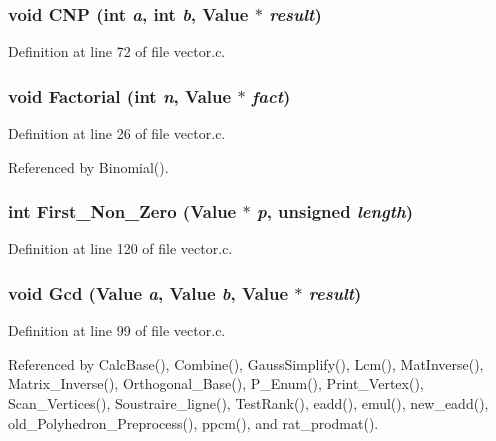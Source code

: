 \subsubsection{\setlength{\rightskip}{0pt plus 5cm}void CNP (int {\em a}, int {\em b}, Value $\ast$ {\em result})}\label{vector_8c_a2}




Definition at line 72 of file vector.c.
\subsubsection{\setlength{\rightskip}{0pt plus 5cm}void Factorial (int {\em n}, Value $\ast$ {\em fact})}\label{vector_8c_a0}




Definition at line 26 of file vector.c.

Referenced by Binomial().

\subsubsection{\setlength{\rightskip}{0pt plus 5cm}int First\_\-Non\_\-Zero (Value $\ast$ {\em p}, unsigned {\em length})}\label{vector_8c_a4}




Definition at line 120 of file vector.c.
\subsubsection{\setlength{\rightskip}{0pt plus 5cm}void Gcd (Value {\em a}, Value {\em b}, Value $\ast$ {\em result})}\label{vector_8c_a3}




Definition at line 99 of file vector.c.

Referenced by Calc\-Base(), Combine(), Gauss\-Simplify(), Lcm(), Mat\-Inverse(), Matrix\_\-Inverse(), Orthogonal\_\-Base(), P\_\-Enum(), Print\_\-Vertex(), Scan\_\-Vertices(), Soustraire\_\-ligne(), Test\-Rank(), eadd(), emul(), new\_\-eadd(), old\_\-Polyhedron\_\-Preprocess(), ppcm(), and rat\_\-prodmat().

